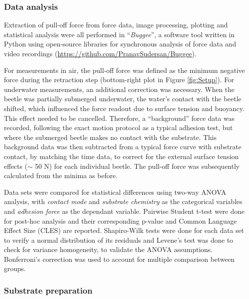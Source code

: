 \documentclass[vruler,JEB]{COB}%
\begin{document}
\subsubsection{Data analysis}

Extraction of pull-off force from force data, image processing, plotting
and statistical analysis were all performed in ``\emph{Buggee}'',
a software tool written in Python using open-source libraries for synchronous
analysis of force data and video recordings (\url{https://github.com/PranavSudersan/Buggee}). 

For measurements in air, the pull-off force was defined as the minimum
negative force during the retraction step (bottom-right plot in Figure \ref{fig:Setup}).
For underwater measurements, an additional correction was necessary.
When the beetle was partially submerged underwater, the water's contact with the beetle shifted, which influenced the force readout due to surface
tension and buoyancy. This effect needed to be cancelled. Therefore, a ``background''
force data was recorded, following the exact motion protocol as a typical adhesion test, but where the submerged beetle makes no contact
with the substrate. This background data was then subtracted from
a typical force curve with substrate contact, by matching the time data, to correct for the external
surface tension effects ($\sim$ 50 \textmu N) for each individual beetle. The pull-off force was subsequently calculated
from the minima as before. 

Data sets were compared for statistical differences using two-way ANOVA analysis, with \emph{contact mode} and \emph{substrate chemistry} as the categorical variables and \emph{adhesion force} as the dependant variable. Pairwise
Student t-test were done for post-hoc analysis and their corresponding p-value and Common Language
Effect Size (CLES) are reported. Shapiro-Wilk tests were done for each
data set to verify a normal distribution of its residuals and Levene's
test was done to check for variance homogeneity, to validate the ANOVA 
assumptions. Bonferroni's correction was used to account for multiple
comparison between groups.

\subsubsection{Substrate preparation}
\end{document}
